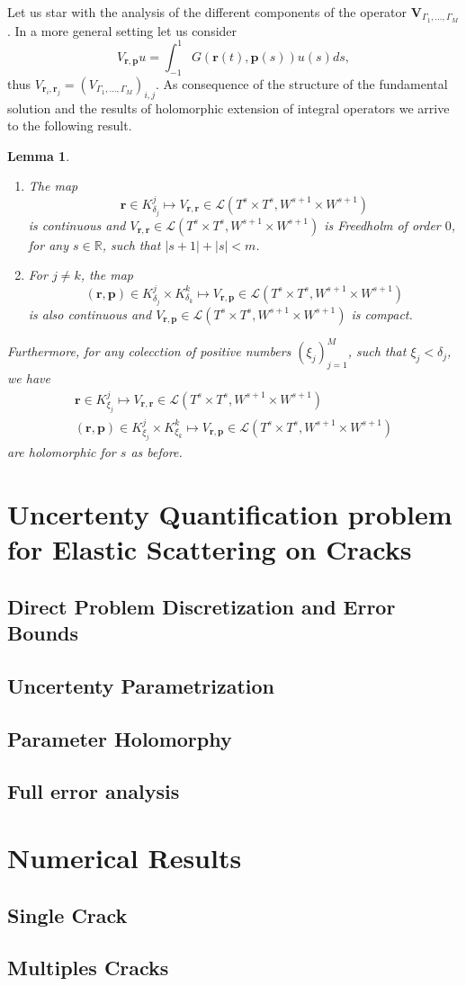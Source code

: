 \documentclass{article}
\newtheorem{lemma}[theorem]{Lemma}
\newcommand{\IR}{{\mathbb R}}
\newcommand{\bp}{{\bm p}}
\newcommand{\br}{\bm{r}}
\begin{document}
Let us star with the analysis of the different components of the operator 
$\mathbf{V}_{\Gamma_1,\hdots,\Gamma_M}$. In a more general setting let us consider 
$$V_{\br,\bp}u  = \int_{-1}^1G(\br(t),\bp(s)) u(s) ds,$$
thus $V_{\br_i, \br_j} = (V_{\Gamma_1,\hdots,\Gamma_M})_{i,j}$. As consequence of the structure of the fundamental solution and the results of holomorphic extension of integral operators we arrive to the following result. 

\begin{lemma}
\begin{enumerate}
\item 
The map 
$$ \br \in K^j_{\delta_j} \mapsto V_{\br,\br} \in 
\mathcal{L}(T^s\times T^s, W^{s+1}\times W^{s+1})$$
is continuous and $ V_{\br,\br} \in 
\mathcal{L}(T^s\times T^s, W^{s+1}\times W^{s+1})$ is Freedholm of order $0$, for any $s\in \IR$, such that $|s+1|+|s|<m$. 
\item 
For $j \neq k$, the map
$$ (\br,\bp) \in K^j_{\delta_j} \times K^k_{\delta_k} \mapsto V_{\br,\bp} \in 
\mathcal{L}(T^s\times T^s, W^{s+1}\times W^{s+1})$$
is also continuous and  $ V_{\br,\bp} \in 
\mathcal{L}(T^s\times T^s, W^{s+1}\times W^{s+1})$ is compact.
\end{enumerate}

Furthermore, for any colecction of positive numbers $(\xi_j)_{j=1}^M$, such that $\xi_j< \delta_j$, we have 
 \begin{align*}
\br \in K^j_{\xi_j} \mapsto V_{\br,\br} \in 
\mathcal{L}(T^s\times T^s, W^{s+1}\times W^{s+1})\\
(\br,\bp) \in K^j_{\xi_j} \times K^k_{\xi_k} \mapsto V_{\br,\bp} \in 
\mathcal{L}(T^s\times T^s, W^{s+1}\times W^{s+1})
\end{align*}
are holomorphic for $s$ as before. 
\end{lemma}
\section{Uncertenty Quantification problem for Elastic Scattering on Cracks}
\subsection{Direct Problem Discretization and Error Bounds}
\subsection{Uncertenty Parametrization}
\subsection{Parameter Holomorphy}
\subsection{Full error analysis}

\section{Numerical Results}
\subsection{Single Crack}
\subsection{Multiples Cracks}
\end{document}
